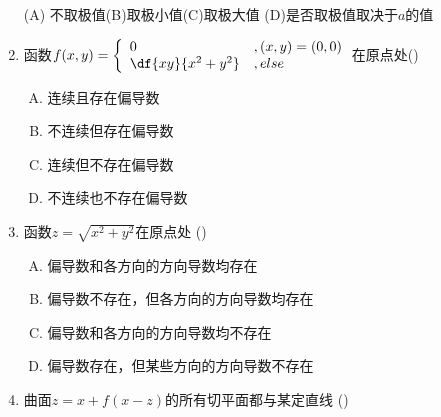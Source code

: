 \begin{enumerate}
  (A) 不取极值\quad(B)取极小值\quad (C)取极大值\quad
  (D)是否取极值取决于$a$的值
  \item 函数$f(x,y)=\left\{\begin{array}{ll}
  0&,(x,y)=(0,0)\\
  \df{xy}{x^2+y^2}&,else
  \end{array}\right.$在原点处(\underline{\hspace{1cm}})
  \begin{enumerate}[(A)]
    \item 连续且存在偏导数
    \item 不连续但存在偏导数
    \item 连续但不存在偏导数
    \item 不连续也不存在偏导数
  \end{enumerate}
  \item 函数$z=\sqrt{x^2+y^2}$在原点处 
  (\underline{\hspace{1cm}})
  \begin{enumerate}[(A)]
    \item 偏导数和各方向的方向导数均存在
    \item 偏导数不存在，但各方向的方向导数均存在
    \item 偏导数和各方向的方向导数均不存在
    \item 偏导数存在，但某些方向的方向导数不存在
  \end{enumerate}
  \item 曲面$z=x+f(x-z)$的所有切平面都与某定直线
  (\underline{\hspace{1cm}})
  

\end{enumerate}

